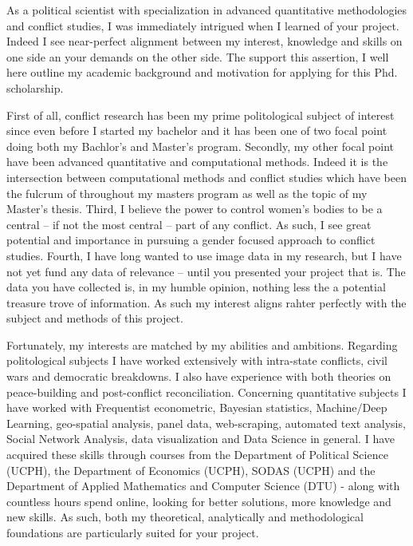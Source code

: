 \documentclass[a4paper]{article}
\begin{document}

As a political scientist with specialization in advanced quantitative methodologies and conflict studies, I was immediately intrigued when I learned of your project. Indeed I see near-perfect alignment between my interest, knowledge and skills on one side an your demands on the other side. The support this assertion, I well here outline my academic background and motivation for applying for this Phd. scholarship.\par

First of all, conflict research has been my prime politological subject of interest since even before I started my bachelor and it has been one of two focal point doing both my Bachlor's and Master's program. Secondly, my other focal point have been advanced quantitative and computational methods. Indeed it is the intersection between computational methods and conflict studies which have been the fulcrum of throughout my masters program as well as the topic of my Master's thesis. Third, I believe the power to control women's bodies to be a central -- if not the most central -- part of any conflict. As such, I see great potential and importance in pursuing a gender focused approach to conflict studies. Fourth, I have long wanted to use image data in my research, but I have not yet fund any data of relevance -- until you presented your project that is. The data you have collected is, in my humble opinion, nothing less the a potential treasure trove of information. As such my interest aligns rahter perfectly with the subject and methods of this project.\par

Fortunately, my interests are matched by my abilities and ambitions. Regarding politological subjects I have worked extensively with intra-state conflicts, civil wars and democratic breakdowns. I also have experience with both theories on peace-building and post-conflict reconciliation. Concerning quantitative subjects I have worked with Frequentist econometric, Bayesian statistics, Machine/Deep Learning, geo-spatial analysis, panel data, web-scraping, automated text analysis, Social Network Analysis, data visualization and Data Science in general. I have acquired these skills through courses from the Department of Political Science (UCPH), the Department of Economics (UCPH), SODAS (UCPH) and the Department of Applied Mathematics and Computer Science (DTU) - along with countless hours spend online, looking for better solutions, more knowledge and new skills. As such, both my theoretical, analytically and methodological foundations are particularly suited for your project.\par %
\end{document}
